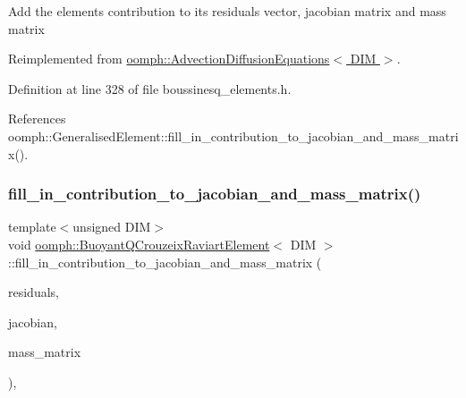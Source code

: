Add the element\textquotesingle{}s contribution to its residuals vector, jacobian matrix and mass matrix 

Reimplemented from \hyperlink{classoomph_1_1AdvectionDiffusionEquations_aed50fe00556434c01bc855766edeb564}{oomph\+::\+Advection\+Diffusion\+Equations$<$ D\+I\+M $>$}.



Definition at line 328 of file boussinesq\+\_\+elements.\+h.



References oomph\+::\+Generalised\+Element\+::fill\+\_\+in\+\_\+contribution\+\_\+to\+\_\+jacobian\+\_\+and\+\_\+mass\+\_\+matrix().

\mbox{\label{classoomph_1_1BuoyantQCrouzeixRaviartElement_a7d22156d87949e4c64d597d60fe00225}} 
\subsubsection{\texorpdfstring{fill\+\_\+in\+\_\+contribution\+\_\+to\+\_\+jacobian\+\_\+and\+\_\+mass\+\_\+matrix()}{fill\_in\_contribution\_to\_jacobian\_and\_mass\_matrix()}\hspace{0.1cm}{\footnotesize\ttfamily [2/3]}}
{\footnotesize\ttfamily template$<$unsigned D\+IM$>$ \\
void \hyperlink{classoomph_1_1BuoyantQCrouzeixRaviartElement}{oomph\+::\+Buoyant\+Q\+Crouzeix\+Raviart\+Element}$<$ D\+IM $>$\+::fill\+\_\+in\+\_\+contribution\+\_\+to\+\_\+jacobian\+\_\+and\+\_\+mass\+\_\+matrix (\begin{DoxyParamCaption}\item[{\hyperlink{classoomph_1_1Vector}{Vector}$<$ double $>$ \&}]{residuals,  }\item[{\hyperlink{classoomph_1_1DenseMatrix}{Dense\+Matrix}$<$ double $>$ \&}]{jacobian,  }\item[{\hyperlink{classoomph_1_1DenseMatrix}{Dense\+Matrix}$<$ double $>$ \&}]{mass\+\_\+matrix }\end{DoxyParamCaption})\hspace{0.3cm}{\ttfamily [inline]}, {\ttfamily [virtual]}}

